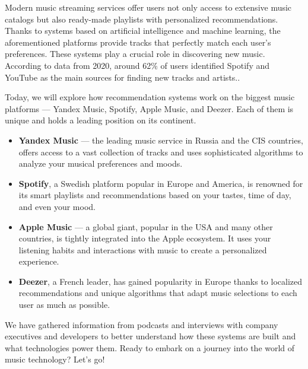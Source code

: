\documentclass[12pt,a4paper]{article}
\begin{document}
Modern music streaming services offer users not only access to extensive music catalogs but also ready-made playlists with personalized recommendations. Thanks to systems based on artificial intelligence and machine learning, the aforementioned platforms provide tracks that perfectly match each user's preferences. These systems play a crucial role in discovering new music. According to data from 2020, around 62\% of users identified Spotify and YouTube as the main sources for finding new tracks and artists.\citep{href}.

Today, we will explore how recommendation systems work on the biggest music platforms — Yandex Music, Spotify, Apple Music, and Deezer. Each of them is unique and holds a leading position on its continent.

\begin{itemize}
 \item \textbf{Yandex Music} — the leading music service in Russia and the CIS countries, offers access to a vast collection of tracks and uses sophisticated algorithms to analyze your musical preferences and moods.

\item \textbf{Spotify}, a Swedish platform popular in Europe and America, is renowned for its smart playlists and recommendations based on your tastes, time of day, and even your mood.

\item \textbf{Apple Music} — a global giant, popular in the USA and many other countries, is tightly integrated into the Apple ecosystem. It uses your listening habits and interactions with music to create a personalized experience.

\item \textbf{Deezer}, a French leader, has gained popularity in Europe thanks to localized recommendations and unique algorithms that adapt music selections to each user as much as possible.
\end{itemize}


We have gathered information from podcasts and interviews with company executives and developers to better understand how these systems are built and what technologies power them. Ready to embark on a journey into the world of music technology? Let's go!
\end{document}

